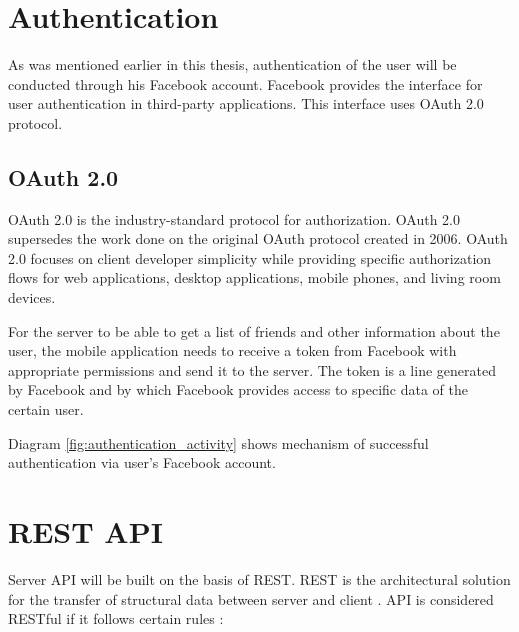 \section{Authentication}
As was mentioned earlier in this thesis, authentication of the user will be conducted through his Facebook account. Facebook provides the interface for user authentication in third-party applications. This interface uses OAuth 2.0 protocol.

\subsection{OAuth 2.0}
OAuth 2.0 is the industry-standard protocol for authorization. OAuth 2.0 supersedes the work done on the original OAuth protocol created in 2006. OAuth 2.0 focuses on client developer simplicity while providing specific authorization flows for web applications, desktop applications, mobile phones, and living room devices. \cite{oauth}

For the server to be able to get a list of friends and other information about the user, the mobile application needs to receive a token from Facebook with appropriate permissions and send it to the server. The token is a line generated by Facebook and by which Facebook provides access to specific data of the certain user.

Diagram \ref{fig:authentication_activity} shows mechanism of successful authentication via user's Facebook account. 


\newcommand{\ritem}[1]{
    \item \textbf{#1} \par
}
\section{REST API}

Server API will be built on the basis of \ac{REST}. \ac{REST} is the architectural solution for the transfer of structural data between server and client \cite{rest}. API is considered RESTful if it follows certain rules \cite{whatisrest}:

